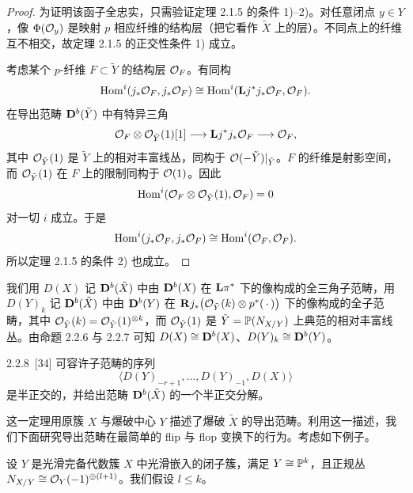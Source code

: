 \begin{proof}
为证明该函子全忠实，只需验证定理 2.1.5 的条件 1)–2)。对任意闭点 $y\in Y$，像 $\Phi(\mathcal{O}_y)$ 是映射 $p$ 相应纤维的结构层（把它看作 $\tilde X$ 上的层）。不同点上的纤维互不相交，故定理 2.1.5 的正交性条件 1) 成立。

考虑某个 $p$-纤维 $F\subset\tilde Y$ 的结构层 $\mathcal{O}_F$。有同构
\[
\operatorname{Hom}^i(j_*\mathcal{O}_F,j_*\mathcal{O}_F)\cong\operatorname{Hom}^i(\mathbf{L} j^*j_*\mathcal{O}_F,\mathcal{O}_F).
\]
在导出范畴 $\mathbf{D}^{b}(\tilde Y)$ 中有特异三角
\[
\mathcal{O}_F\otimes\mathcal{O}_{\tilde Y}(1)[1]\longrightarrow\mathbf{L} j^*j_*\mathcal{O}_F\longrightarrow\mathcal{O}_F,
\]
其中 $\mathcal{O}_{\tilde Y}(1)$ 是 $\tilde Y$ 上的相对丰富线丛，同构于 $\mathcal{O}(-\tilde Y)|_{\tilde Y}$。$F$ 的纤维是射影空间，而 $\mathcal{O}_{\tilde Y}(1)$ 在 $F$ 上的限制同构于 $\mathcal{O}(1)$。因此
\[
\operatorname{Hom}^i(\mathcal{O}_F\otimes\mathcal{O}_{\tilde Y}(1),\mathcal{O}_F)=0
\]
对一切 $i$ 成立。于是
\[
\operatorname{Hom}^i(j_*\mathcal{O}_F,j_*\mathcal{O}_F)\cong\operatorname{Hom}^i(\mathcal{O}_F,\mathcal{O}_F).
\]
所以定理 2.1.5 的条件 2) 也成立。
\end{proof}

我们用 $D(X)$ 记 $\mathbf{D}^{b}(\tilde X)$ 中由 $\mathbf{D}^{b}(X)$ 在 $\mathbf{L}\pi^*$ 下的像构成的全三角子范畴，用 $D(Y)_k$ 记 $\mathbf{D}^{b}(\tilde X)$ 中由 $\mathbf{D}^{b}(Y)$ 在 $\mathbf{R} j_*\bigl(\mathcal{O}_{\tilde Y}(k)\otimes p^*(\,\cdot\,)\bigr)$ 下的像构成的全子范畴，其中 $\mathcal{O}_{\tilde Y}(k)=\mathcal{O}_{\tilde Y}(1)^{\otimes k}$，而 $\mathcal{O}_{\tilde Y}(1)$ 是 $\tilde Y=\mathbb{P}(N_{X/Y})$ 上典范的相对丰富线丛。由命题 2.2.6 与 2.2.7 可知 $D(X)\cong\mathbf{D}^{b}(X)$、$D(Y)_k\cong\mathbf{D}^{b}(Y)$。

\begin{theorem}{2.2.8}~[34] 可容许子范畴的序列
\[
\bigl\langle D(Y)_{-r+1},\dots,D(Y)_{-1},D(X)\bigr\rangle
\]
是半正交的，并给出范畴 $\mathbf{D}^{b}(\tilde X)$ 的一个半正交分解。
\end{theorem}


这一定理用原簇 $X$ 与爆破中心 $Y$ 描述了爆破 $\tilde X$ 的导出范畴。利用这一描述，我们下面研究导出范畴在最简单的 flip 与 flop 变换下的行为。考虑如下例子。

设 $Y$ 是光滑完备代数簇 $X$ 中光滑嵌入的闭子簇，满足 $Y\cong\mathbb{P}^k$，且正规丛 $N_{X/Y}\cong\mathcal{O}_Y(-1)^{\oplus(l+1)}$。我们假设 $l\leqslant k$。

